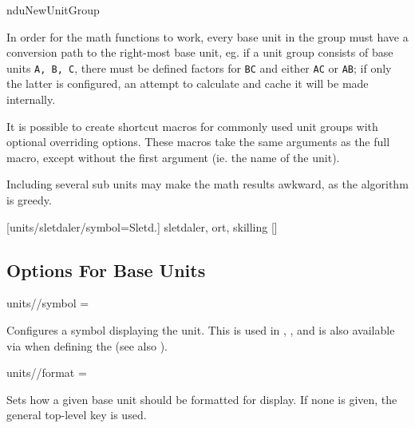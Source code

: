 \documentclass[
	a4paper,
	margin=4cm
]{article}
\begin{document}
\begin{docCommand}
	{nduNewUnitGroup}
	{}

	In order for the math functions to work, every base unit in the group must have a conversion path to the right-most base unit, eg. if a unit group consists of base units \texttt{A, B, C}, there must be defined factors for \texttt{B\rightarrow C} and either \texttt{A\rightarrow C} or \texttt{A\rightarrow B}; if only the latter is configured, an attempt to calculate and cache it will be made internally.

	It is possible to create shortcut macros for commonly used unit groups with optional overriding options. These macros take the same arguments as the full  macro, except without the first argument (ie. the name of the unit).
	
	Including several sub units may make the math results awkward, as the algorithm is greedy.

\begin{dispExample}
	[units/sletdaler/symbol={Sletd.}]
	{sletdaler, ort, skilling}
	[\mySldl]
\end{dispExample}

\end{docCommand}

\clearpage
\subsection{Options For Base Units}

\begin{docKey}
	[]
	[doc label=units:symbol]
	{units//symbol}
	{=}
	{}

	Configures a symbol displaying the unit. This is used in , , and is also available via  when defining the  (see also ).
\end{docKey}

\begin{docKey}
	[]
	[doc label=units:format]
	{units//format}
	{=}
	{}

	Sets how a given base unit should be formatted for display. If none is given, the general top-level  key is used.
\end{docKey}
\end{document}
